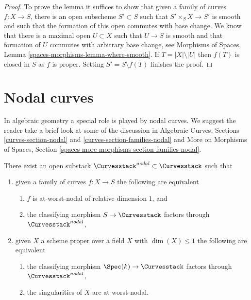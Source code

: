 \begin{proof}
To prove the lemma it suffices to show that given a family of curves
$f : X \to S$, there is an open subscheme $S' \subset S$
such that $S' \times_S X \to S'$ is smooth and such that the
formation of this open commutes with base change.
We know that there is a maximal open $U \subset X$ such
that $U \to S$ is smooth and that formation of $U$ commutes
with arbitrary base change, see
Morphisms of Spaces, Lemma \ref{spaces-morphisms-lemma-where-smooth}.
If $T = |X| \setminus |U|$ then $f(T)$ is closed in $S$
as $f$ is proper.
Setting $S' = S \setminus f(T)$ finishes the proof.
\end{proof}









\section{Nodal curves}
\label{section-nodal-curves}

\noindent
In algebraic geometry a special role is played by nodal curves.
We suggest the reader take a brief look at some of the discussion
in Algebraic Curves, Sections \ref{curves-section-nodal} and
\ref{curves-section-families-nodal}
and More on Morphisms of Spaces, Section
\ref{spaces-more-morphisms-section-families-nodal}.

\begin{lemma}
\label{lemma-nodal-curves}
There exist an open substack $\Curvesstack^{nodal} \subset \Curvesstack$
such that
\begin{enumerate}
\item given a family of curves $f : X \to S$ the following are equivalent
\begin{enumerate}
\item $f$ is at-worst-nodal of relative dimension $1$, and
\item the classifying morphism $S \to \Curvesstack$ factors
through $\Curvesstack^{nodal}$,
\end{enumerate}
\item given $X$ a scheme proper over a field $X$ with
$\dim(X) \leq 1$ the following are equivalent
\begin{enumerate}
\item the classifying morphism $\Spec(k) \to \Curvesstack$ factors
through $\Curvesstack^{nodal}$,
\item the singularities of $X$ are at-worst-nodal.
\end{enumerate}
\end{enumerate}
\end{lemma}

